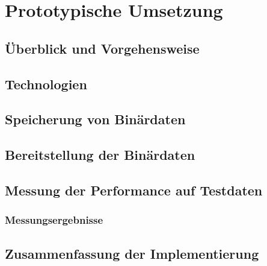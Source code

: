 \chapter{Prototypische Umsetzung}

\section{Überblick und Vorgehensweise}

\section{Technologien}

\section{Speicherung von Binärdaten}

\section{Bereitstellung der Binärdaten}

\section{Messung der Performance auf Testdaten}

\subsection{Messungsergebnisse}

\section{Zusammenfassung der Implementierung}